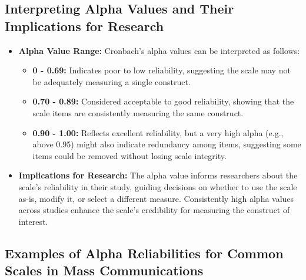 \documentclass[
]{book}
\providecommand{\tightlist}{%
  \setlength{\itemsep}{0pt}\setlength{\parskip}{0pt}}
\begin{document}
\hypertarget{interpreting-alpha-values-and-their-implications-for-research}{%
\subsection*{Interpreting Alpha Values and Their Implications for Research}\label{interpreting-alpha-values-and-their-implications-for-research}}

\begin{itemize}
\tightlist
\item
  \textbf{Alpha Value Range:} Cronbach's alpha values can be interpreted as follows:

  \begin{itemize}
  \tightlist
  \item
    \textbf{0 - 0.69:} Indicates poor to low reliability, suggesting the scale may not be adequately measuring a single construct.
  \item
    \textbf{0.70 - 0.89:} Considered acceptable to good reliability, showing that the scale items are consistently measuring the same construct.
  \item
    \textbf{0.90 - 1.00:} Reflects excellent reliability, but a very high alpha (e.g., above 0.95) might also indicate redundancy among items, suggesting some items could be removed without losing scale integrity.
  \end{itemize}
\item
  \textbf{Implications for Research:} The alpha value informs researchers about the scale's reliability in their study, guiding decisions on whether to use the scale as-is, modify it, or select a different measure. Consistently high alpha values across studies enhance the scale's credibility for measuring the construct of interest.
\end{itemize}

\hypertarget{examples-of-alpha-reliabilities-for-common-scales-in-mass-communications}{%
\subsection*{Examples of Alpha Reliabilities for Common Scales in Mass Communications}\label{examples-of-alpha-reliabilities-for-common-scales-in-mass-communications}}
\end{document}
